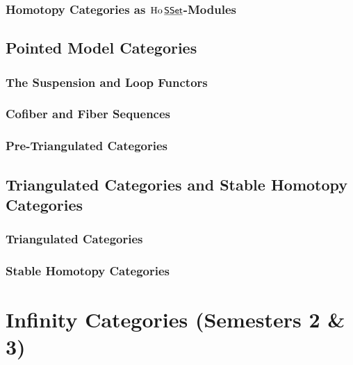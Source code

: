 \documentclass[12pt]{report}
\begin{document}


\subsection{Homotopy Categories as \texorpdfstring{$\operatorname{Ho}\protect\mathsf{\protect\underline{SSet}}$}{Ho SSet}-Modules}



\section{Pointed Model Categories}

\subsection{The Suspension and Loop Functors}



\subsection{Cofiber and Fiber Sequences}



\subsection{Pre-Triangulated Categories}



\section{Triangulated Categories and Stable Homotopy Categories}

\subsection{Triangulated Categories}



\subsection{Stable Homotopy Categories}



\chapter{Infinity Categories (Semesters 2 \& 3)}
\end{document}
